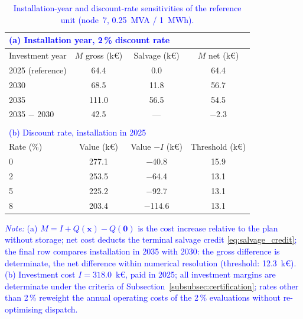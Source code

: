 \documentclass[preprint,12pt]{elsarticle}
\begin{document}
\begin{table}[htbp!]
    \centering
    \caption{\textcolor{blue}{Installation-year and discount-rate sensitivities of the reference unit (node~7, 0.25~MVA / 1~MWh).}}
    \label{tab:res_year_ladder}
    \footnotesize\setlength{\tabcolsep}{5pt}
    \begin{tabular}{l c c c}
        \multicolumn{4}{l}{\textcolor{blue}{(a) Installation year, 2\,\% discount rate}} \\
        \toprule
        Investment year & $M$ gross (k\euro) & Salvage (k\euro) & $M$ net (k\euro) \\
        \midrule
        2025 (reference) & 64.4  & 0.0  & 64.4 \\
        2030             & 68.5  & 11.8 & 56.7 \\
        2035             & 111.0 & 56.5 & 54.5 \\
        2035 $-$ 2030    & 42.5  & ---  & $-$2.3 \\
        \bottomrule
        \multicolumn{4}{c}{} \\
        \multicolumn{4}{l}{\textcolor{blue}{(b) Discount rate, installation in 2025}} \\
        \toprule
        Rate (\%) & Value (k\euro) & Value $- I$ (k\euro) & Threshold (k\euro) \\
        \midrule
        0 & 277.1 & $-$40.8  & 15.9 \\
        2 & 253.5 & $-$64.4  & 13.1 \\
        5 & 225.2 & $-$92.7  & 13.1 \\
        8 & 203.4 & $-$114.6 & 13.1 \\
        \bottomrule
    \end{tabular}
    \par\smallskip
    \begin{minipage}{\linewidth}
        \footnotesize\raggedright
        \textcolor{blue}{\textit{Note:}
        (a) $M = I + Q(\boldsymbol{x}) - Q(\boldsymbol{0})$ is the cost increase relative to the plan without storage; net cost deducts the terminal salvage credit \eqref{eq:salvage_credit}; the final row compares installation in 2035 with 2030: the gross difference is determinate, the net difference within numerical resolution (threshold: 12.3~k\euro{}).
        (b) Investment cost $I=318.0$~k\euro{}, paid in 2025; all investment margins are determinate under the criteria of Subsection~\ref{subsubsec:certification}; rates other than 2\,\% reweight the annual operating costs of the 2\,\% evaluations without re-optimising dispatch.}
    \end{minipage}
\end{table}
\end{document}
